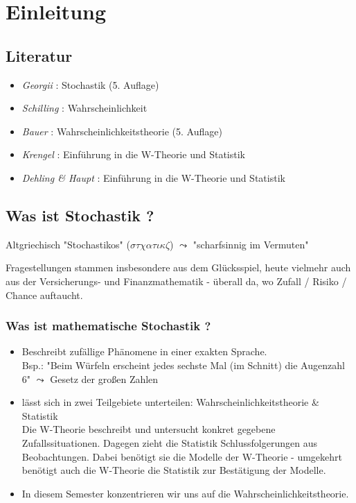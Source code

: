 \chapter{Einleitung}

\section*{Literatur}
\begin{itemize}[nolistsep]
    \item \textit{Georgii} : Stochastik (5. Auflage)
    \item \textit{Schilling} : Wahrscheinlichkeit
    \item \textit{Bauer} : Wahrscheinlichkeitstheorie (5. Auflage)
    \item \textit{Krengel} : Einführung in die W-Theorie und Statistik
    \item \textit{Dehling \& Haupt} : Einführung in die W-Theorie und Statistik
\end{itemize}

\section*{Was ist Stochastik ?}

Altgriechisch "Stochastikos" ($\sigma \tau  \chi \alpha \tau \iota \kappa  \zeta$) $\leadsto$ "scharfsinnig im Vermuten" %

Fragestellungen stammen insbesondere aus dem Glücksspiel, heute vielmehr auch aus der Versicherungs- und Finanzmathematik - überall da, wo Zufall / Risiko / Chance auftaucht.

\subsection*{Was ist mathematische Stochastik ?}
\begin{itemize}[leftmargin=*]
    \item Beschreibt zufällige Phänomene in einer exakten Sprache. \\
    Bsp.: "Beim Würfeln erscheint jedes sechste Mal (im Schnitt) die Augenzahl 6" $\leadsto$ Gesetz der großen Zahlen
    \item lässt sich in zwei Teilgebiete unterteilen: Wahrscheinlichkeitstheorie \& Statistik \\
    Die W-Theorie beschreibt und untersucht konkret gegebene Zufallssituationen. Dagegen zieht die Statistik Schlussfolgerungen aus Beobachtungen. Dabei benötigt sie die Modelle der W-Theorie - umgekehrt benötigt auch die W-Theorie die Statistik zur Bestätigung der Modelle.
    \item In diesem Semester konzentrieren wir uns auf die Wahrscheinlichkeitstheorie.
\end{itemize}


